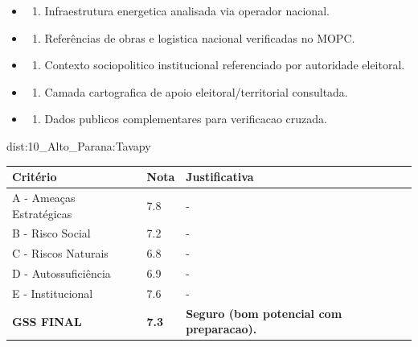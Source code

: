 {\begin{itemize}
\item
  \begin{enumerate}
  \def\labelenumi{\arabic{enumi})}
  \setcounter{enumi}{7}
  \tightlist
  \item
    Infraestrutura energetica analisada via operador nacional.
  \end{enumerate}
\item
  \begin{enumerate}
  \def\labelenumi{\arabic{enumi})}
  \setcounter{enumi}{8}
  \tightlist
  \item
    Referências de obras e logistica nacional verificadas no MOPC.
  \end{enumerate}
\item
  \begin{enumerate}
  \def\labelenumi{\arabic{enumi})}
  \setcounter{enumi}{9}
  \tightlist
  \item
    Contexto sociopolitico institucional referenciado por autoridade
    eleitoral.
  \end{enumerate}
\item
  \begin{enumerate}
  \def\labelenumi{\arabic{enumi})}
  \setcounter{enumi}{10}
  \tightlist
  \item
    Camada cartografica de apoio eleitoral/\allowbreak territorial consultada.
  \end{enumerate}
\item
  \begin{enumerate}
  \def\labelenumi{\arabic{enumi})}
  \setcounter{enumi}{11}
  \tightlist
  \item
    Dados publicos complementares para verificacao cruzada.
  \end{enumerate}
\end{itemize}}{dist:10_Alto_Parana:Tavapy}
\begin{table}[ht!]
\small \begin{tabular}{p{3.0cm}p{0.8cm}p{6.0cm}} \toprule
\textbf{Critério} & \textbf{Nota} & \textbf{Justificativa} \\ \midrule
A - Ameaças Estratégicas & 7.8 & - \\
B - Risco Social & 7.2 & - \\
C - Riscos Naturais & 6.8 & - \\
D - Autossuficiência & 6.9 & - \\
E - Institucional & 7.6 & - \\
\midrule \textbf{GSS FINAL} & \textbf{7.3} & \textbf{Seguro (bom potencial com preparacao).} \\ \bottomrule \end{tabular}
\end{table}
